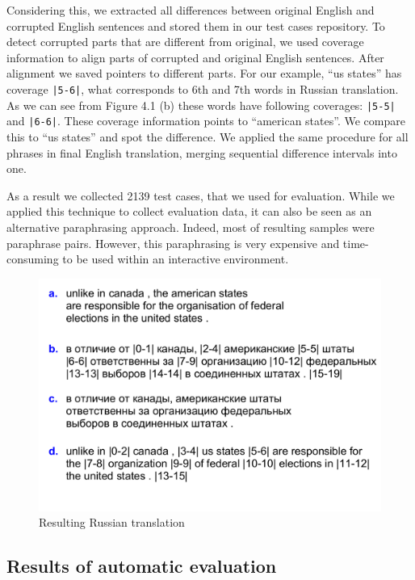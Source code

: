 Considering this, we extracted all differences between original English and corrupted English sentences and stored them in our test cases repository. To detect corrupted parts that are different from original, we used coverage information to align parts of corrupted and original English sentences. After alignment we saved pointers to different parts. For our example, ``us states'' has coverage \texttt{|5-6|}, what corresponds to 6th and 7th words in Russian translation. As we can see from Figure 4.1 (b) these words have following coverages: \texttt{|5-5|} and \texttt{|6-6|}. These coverage information points to ``american states''. We compare this to ``us states'' and spot the difference. We applied the same procedure for all phrases in final English translation, merging sequential difference intervals into one.

As a result we collected 2139 test cases, that we used for evaluation. While we applied this technique to collect evaluation data, it can also be seen as an alternative paraphrasing approach. Indeed, most of resulting samples were paraphrase pairs. However, this paraphrasing is very expensive and time-consuming to be used within an interactive environment. 

\begin{figure}
 \centering 
 \includegraphics[scale=0.75]{g/rus-sample1.pdf}
 \caption{Resulting Russian translation}
\end{figure}

\subsection{Results of automatic evaluation}


